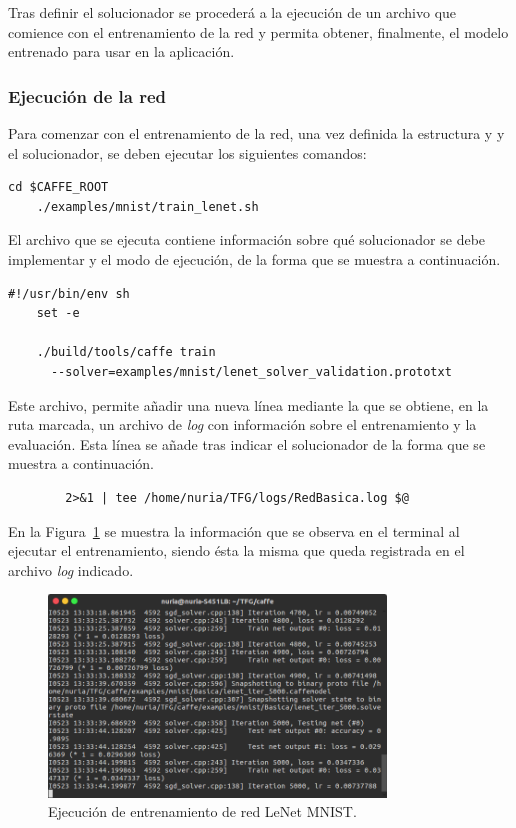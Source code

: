	Tras definir el solucionador se procederá a la ejecución de un archivo que comience con el entrenamiento de la red y permita obtener, finalmente, el modelo entrenado para usar en la aplicación.\\
	
\subsubsection{Ejecución de la red}
	Para comenzar con el entrenamiento de la red, una vez definida la estructura y y el solucionador, se deben ejecutar los siguientes comandos:
	\vspace{10pt}
	\begin{lstlisting}[frame=single]
	cd $CAFFE_ROOT
	./examples/mnist/train_lenet.sh	
	\end{lstlisting}
	
	El archivo que se ejecuta contiene información sobre qué solucionador se debe implementar y el modo de ejecución, de la forma que se muestra a continuación.
	\vspace{10pt}
	\begin{lstlisting}[frame=single]
	#!/usr/bin/env sh
	set -e
	
	./build/tools/caffe train 
	  --solver=examples/mnist/lenet_solver_validation.prototxt 
	\end{lstlisting}
	Este archivo, permite añadir una nueva línea mediante la que se obtiene, en la ruta marcada, un archivo de \textit{log} con información sobre el entrenamiento y la evaluación. Esta línea se añade tras indicar el solucionador de la forma que se muestra a continuación.
	\vspace{10pt}
	\begin{lstlisting}
		2>&1 | tee /home/nuria/TFG/logs/RedBasica.log $@
	\end{lstlisting} 
	
	En la Figura~\ref{fig.entrenamiento} se muestra la información que se observa en el terminal al ejecutar el entrenamiento, siendo ésta la misma que queda registrada en el archivo \textit{log} indicado.
	
	\begin{figure}[H]
		\begin{center}
			\includegraphics[width=0.8\textwidth]{figures/RedBasica5000}
			\caption{Ejecución de entrenamiento de red LeNet MNIST.}
			\label{fig.entrenamiento}
		\end{center}
	\end{figure}
	
